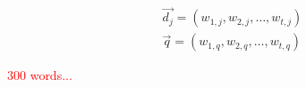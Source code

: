 \begin{align}
\vec{d_j} = \left(w_{1,j}, w_{2,j}, \ldots, w_{t,j} \right) \\
\vec{q} = \left(w_{1,q}, w_{2,q}, \ldots, w_{t,q} \right)
\end{align}

\textcolor{red}{300 words...}

\begin{comment}
\end{comment}

\begin{draft}
\end{draft}

\begin{shaded}
\end{shaded}


